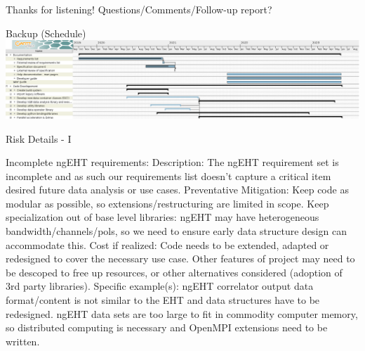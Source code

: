 \documentclass[8pt]{beamer}
\begin{document}
            


\begin{frame}{Thanks for listening!}
    \centering
    Questions/Comments/Follow-up report?
\end{frame}

\begin{frame}{Backup (Schedule)}
\centering
\includegraphics[width=\textwidth]{MSRI-HOPS-2021-3.png}
\end{frame}

\begin{frame}{Risk Details - I}
  
 \begin{outline}
        \1 Incomplete ngEHT requirements:
            \2 Description: The ngEHT requirement set is incomplete and as such our requirements list doesn't capture a critical item desired future data analysis or use cases.
            \2 Preventative Mitigation: Keep code as modular as possible, so extensions/restructuring are limited in scope. Keep specialization out of base level libraries:
                \3 ngEHT may have heterogeneous bandwidth/channels/pols, so we need to ensure early data structure design can accommodate this.
            \2 Cost if realized: Code needs to be extended, adapted or redesigned to cover the necessary use case. Other features of project may need to be descoped to free up resources, or other alternatives considered (adoption of 3rd party libraries).
            \2 Specific example(s): 
            \3 ngEHT correlator output data format/content is not similar to the EHT and data structures have to be redesigned.
            \3 ngEHT data sets are too large to fit in commodity computer memory, so distributed computing is necessary and OpenMPI extensions need to be written.
    \end{outline}
    
\end{frame}
\end{document}
